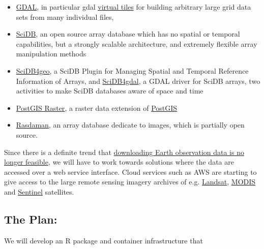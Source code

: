 \begin{itemize}
\tightlist
\item
  \href{https://gdal.org/}{GDAL}, in particular gdal
  \href{https://gdal.org/programs/gdalbuildvrt.html}{virtual tiles} for
  building arbitrary large grid data sets from many individual files,
\item
  \href{https://www.paradigm4.com/}{SciDB}, an open source array database
  which has no spatial or temporal capabilities, but a strongly scalable
  architecture, and extremely flexible array manipulation methods
\item
  \href{https://github.com/appelmar/scidb4geo}{SciDB4geo}, a SciDB
  Plugin for Managing Spatial and Temporal Reference Information of
  Arrays, and \href{https://github.com/appelmar/scidb4gdal}{SciDB4gdal},
  a GDAL driver for SciDB arrays, two activities to make SciDB databases
  aware of space and time
\item
  \href{https://postgis.net/docs/RT_reference.html}{PostGIS Raster}, a
  raster data extension of \href{https://www.postgis.net/}{PostGIS}
\item
  \href{https://www.rasdaman.com/}{Rasdaman}, an array database dedicate
  to images, which is partially open source.
\end{itemize}

Since there is a definite trend that
\href{https://r-spatial.org/2016/11/29/openeo.html}{downloading Earth
observation data is no longer feasible}, we will have to work towards
solutions where the data are accessed over a web service interface.
Cloud services such as AWS are starting to give access to the large
remote sensing imagery archives of e.g.
\href{https://aws.amazon.com/blogs/aws/start-using-landsat-on-aws/}{Landsat},
\href{https://aws.amazon.com/public-datasets/modis/}{MODIS} and
\href{http://sentinel-pds.s3-website.eu-central-1.amazonaws.com/}{Sentinel}
satellites.

\subsection*{The Plan:}\label{the-plan}

We will develop an R package and container infrastructure that

